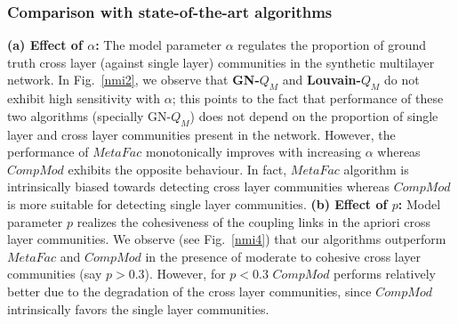\subsubsection{Comparison with state-of-the-art algorithms}

\textbf{(a) Effect of $\alpha$:} The model parameter $\alpha$ regulates the proportion of ground truth cross layer
(against single layer) communities in the
 synthetic multilayer network. In Fig.~\ref{nmi2}, we observe that \textbf{GN-$Q_M$} and \textbf{Louvain-$Q_M$} do not exhibit high
 sensitivity with $\alpha$; this points to the
 fact that performance of these two algorithms (specially GN-$Q_M$) does not depend on the proportion of single layer
 and cross layer communities present in the network. However, the performance of $MetaFac$ monotonically improves
 with increasing $\alpha$ whereas $CompMod$
exhibits the opposite behaviour. In fact, $MetaFac$ algorithm is intrinsically biased towards detecting cross layer
communities whereas
 $CompMod$ is more suitable for detecting single layer communities.
\textbf{(b) Effect of $p$:}  Model parameter $p$ realizes the cohesiveness of the coupling links in the apriori cross layer communities.
We observe (see Fig.~\ref{nmi4}) that our algorithms outperform $MetaFac$ and $CompMod$ in the presence of moderate to cohesive 
cross layer communities (say $p>0.3$). However, for $p<0.3$ $CompMod$ performs relatively better due to the degradation of
the cross layer communities, since $CompMod$ intrinsically favors the single layer communities.

